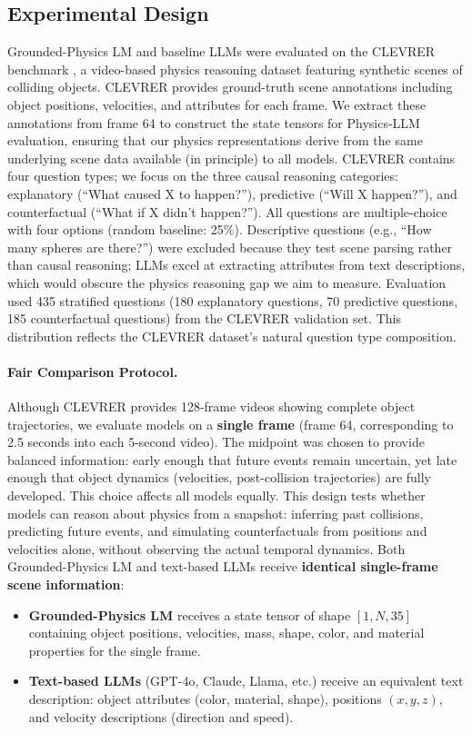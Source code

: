 \documentclass[conference]{IEEEtran}
\theoremstyle{plain}
\theoremstyle{definition}
\theoremstyle{remark}
\begin{document}
\subsection{Experimental Design}
Grounded-Physics LM and baseline LLMs were evaluated on the CLEVRER benchmark \cite{yi2020clevrer}, a video-based physics reasoning dataset featuring synthetic scenes of colliding objects. CLEVRER provides ground-truth scene annotations including object positions, velocities, and attributes for each frame. We extract these annotations from frame 64 to construct the state tensors for Physics-LLM evaluation, ensuring that our physics representations derive from the same underlying scene data available (in principle) to all models. CLEVRER contains four question types; we focus on the three causal reasoning categories: explanatory (``What caused X to happen?''), predictive (``Will X happen?''), and counterfactual (``What if X didn't happen?''). All questions are multiple-choice with four options (random baseline: 25\%). Descriptive questions (e.g., ``How many spheres are there?'') were excluded because they test scene parsing rather than causal reasoning; LLMs excel at extracting attributes from text descriptions, which would obscure the physics reasoning gap we aim to measure. Evaluation used 435 stratified questions (180 explanatory questions, 70 predictive questions, 185 counterfactual questions) from the CLEVRER validation set. This distribution reflects the CLEVRER dataset's natural question type composition.

\paragraph{Fair Comparison Protocol.} Although CLEVRER provides 128-frame videos showing complete object trajectories, we evaluate models on a \textbf{single frame} (frame 64, corresponding to 2.5 seconds into each 5-second video). The midpoint was chosen to provide balanced information: early enough that future events remain uncertain, yet late enough that object dynamics (velocities, post-collision trajectories) are fully developed. This choice affects all models equally. This design tests whether models can reason about physics from a snapshot: inferring past collisions, predicting future events, and simulating counterfactuals from positions and velocities alone, without observing the actual temporal dynamics. Both Grounded-Physics LM and text-based LLMs receive \textbf{identical single-frame scene information}:

\begin{itemize}[nosep,leftmargin=*]
    \item \textbf{Grounded-Physics LM} receives a state tensor of shape $[1, N, 35]$ containing object positions, velocities, mass, shape, color, and material properties for the single frame.
    \item \textbf{Text-based LLMs} (GPT-4o, Claude, Llama, etc.) receive an equivalent text description: object attributes (color, material, shape), positions $(x, y, z)$, and velocity descriptions (direction and speed).
\end{itemize}
\end{document}
